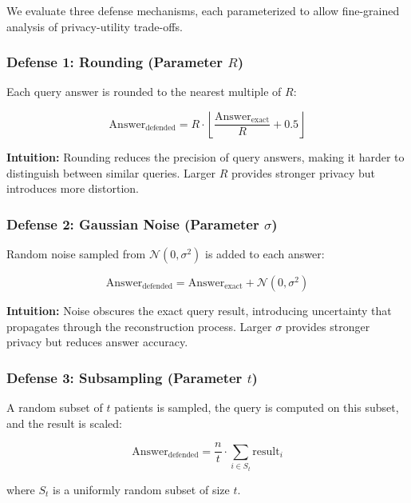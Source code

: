 \documentclass[11pt,letterpaper]{article}
\begin{document}
We evaluate three defense mechanisms, each parameterized to allow fine-grained analysis of privacy-utility trade-offs.

\subsubsection{Defense 1: Rounding (Parameter $R$)}

Each query answer is rounded to the nearest multiple of $R$:

\begin{equation}
    \text{Answer}_{\text{defended}} = R \cdot \left\lfloor \frac{\text{Answer}_{\text{exact}}}{R} + 0.5 \right\rfloor
\end{equation}

\textbf{Intuition:} Rounding reduces the precision of query answers, making it harder to distinguish between similar queries. Larger $R$ provides stronger privacy but introduces more distortion.

\subsubsection{Defense 2: Gaussian Noise (Parameter $\sigma$)}

Random noise sampled from $\mathcal{N}(0, \sigma^2)$ is added to each answer:

\begin{equation}
    \text{Answer}_{\text{defended}} = \text{Answer}_{\text{exact}} + \mathcal{N}(0, \sigma^2)
\end{equation}

\textbf{Intuition:} Noise obscures the exact query result, introducing uncertainty that propagates through the reconstruction process. Larger $\sigma$ provides stronger privacy but reduces answer accuracy.

\subsubsection{Defense 3: Subsampling (Parameter $t$)}

A random subset of $t$ patients is sampled, the query is computed on this subset, and the result is scaled:

\begin{equation}
    \text{Answer}_{\text{defended}} = \frac{n}{t} \cdot \sum_{i \in S_t} \text{result}_i
\end{equation}

where $S_t$ is a uniformly random subset of size $t$.
\end{document}
